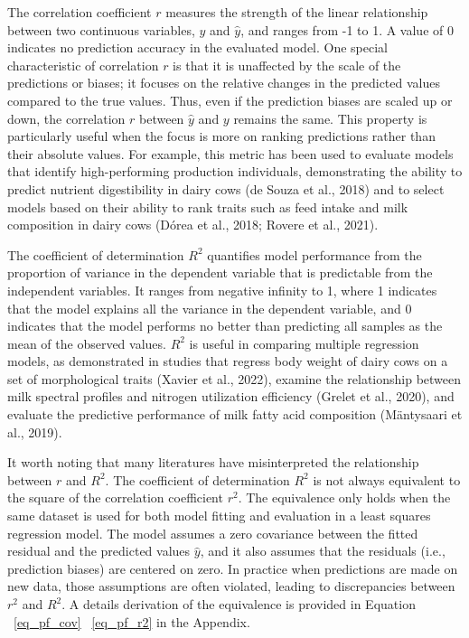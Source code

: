 The correlation coefficient \(r\) measures the strength of the linear relationship between two continuous variables, \(y\) and \(\hat{y}\), and ranges from -1 to 1. A value of 0 indicates no prediction accuracy in the evaluated model. One special characteristic of correlation \(r\) is that it is unaffected by the scale of the predictions or biases; it focuses on the relative changes in the predicted values compared to the true values. Thus, even if the prediction biases are scaled up or down, the correlation \(r\) between \(\hat{y}\) and \(y\) remains the same. This property is particularly useful when the focus is more on ranking predictions rather than their absolute values. For example, this metric has been used to evaluate models that identify high-performing production individuals, demonstrating the ability to predict nutrient digestibility in dairy cows (de Souza et al., 2018) and to select models based on their ability to rank traits such as feed intake and milk composition in dairy cows (Dórea et al., 2018; Rovere et al., 2021).

The coefficient of determination \(R^2\) quantifies model performance from the proportion of variance in the dependent variable that is predictable from the independent variables. It ranges from negative infinity to 1, where 1 indicates that the model explains all the variance in the dependent variable, and 0 indicates that the model performs no better than predicting all samples as the mean of the observed values. \(R^2\) is useful in comparing multiple regression models, as demonstrated in studies that regress body weight of dairy cows on a set of morphological traits (Xavier et al., 2022), examine the relationship between milk spectral profiles and nitrogen utilization efficiency (Grelet et al., 2020), and evaluate the predictive performance of milk fatty acid composition (Mäntysaari et al., 2019).

It worth noting that many literatures have misinterpreted the relationship between $r$ and $R^2$. The coefficient of determination $R^2$ is not always equivalent to the square of the correlation coefficient $r^2$. The equivalence only holds when the same dataset is used for both model fitting and evaluation in a least squares regression model. The model assumes a zero covariance between the fitted residual and the predicted values $\hat{y}$, and it also assumes that the residuals (i.e., prediction biases) are centered on zero. In practice when predictions are made on new data, those assumptions are often violated, leading to discrepancies between $r^2$ and $R^2$. A details derivation of the equivalence is provided in Equation ~\ref{eq_pf_cov} ~\ref{eq_pf_r2} in the Appendix.


